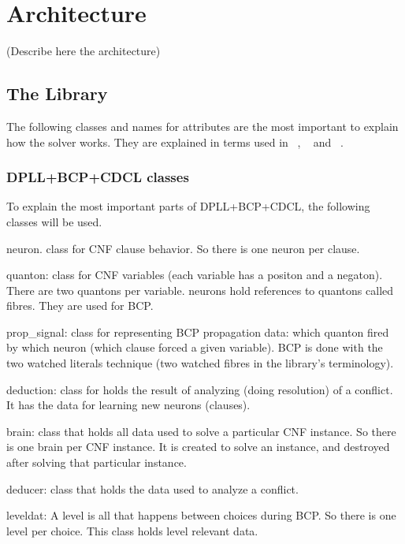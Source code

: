 \documentclass{easychair}
\newcommand{\neuron}{\textsf{neuron}}
\newcommand{\quanton}{\textsf{quanton}}
\newcommand{\propsignal}{\textsf{prop\_signal}}
\newcommand{\deduction}{\textsf{deduction}}
\newcommand{\brain}{\textsf{brain}}
\newcommand{\deducer}{\textsf{deducer}}
\newcommand{\leveldat}{\textsf{leveldat}}
\begin{document}
\section{Architecture}
\label{sect:architecture}

(Describe here the architecture)

\subsection{The Library}

The following classes and names for attributes are the most important to explain how the solver works. They are explained in terms used in ~\cite{silva-95}, ~\cite{moskewicz-01} and  ~\cite{bastert-02}.

\subsubsection{DPLL+BCP+CDCL classes}

To explain the most important parts of  DPLL+BCP+CDCL, the following classes will be used.

{\neuron}. class for CNF clause behavior. So there is one {\neuron} per clause.

{\quanton}: class for CNF variables (each variable has a positon and a negaton). There are two {\quanton}s per variable. {\neuron}s hold references to {\quanton}s called fibres. They are used for BCP.

{\propsignal}: class for representing BCP propagation data: which {\quanton} fired by which {\neuron} (which clause forced a given variable). BCP is done with the two watched literals technique (two watched fibres in the library's terminology).

{\deduction}: class for holds the result of analyzing (doing resolution) of a conflict. It has the data for learning new {\neuron}s (clauses).

{\brain}: class that holds all data used to solve a particular CNF instance. So there is one {\brain} per CNF instance. It is created to solve an instance, and destroyed after solving that particular instance.

{\deducer}: class that holds the data used to analyze a conflict.

{\leveldat}: A level is all that happens between choices during BCP. So there is one level per choice. This class holds level relevant data.
\end{document}
